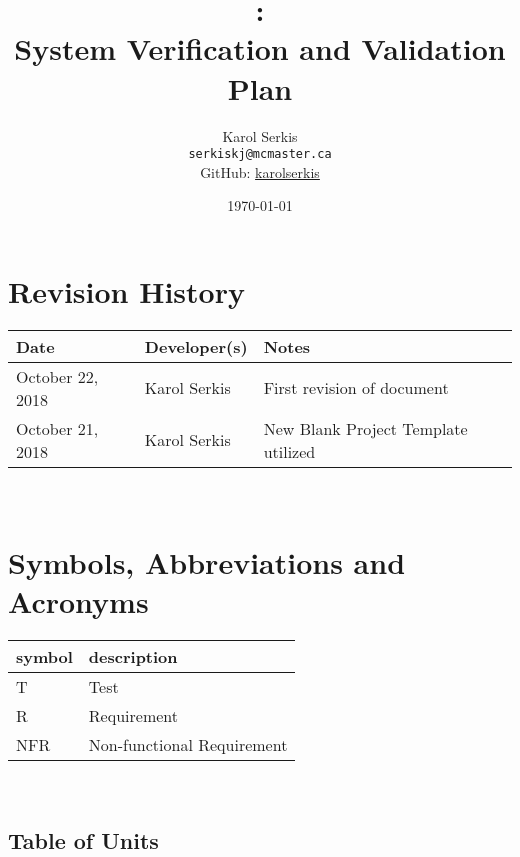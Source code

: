 \documentclass[12pt, titlepage]{article}
\begin{document}
\title{\progname:\\ System Verification and Validation Plan} 
\author{Karol Serkis\\\texttt{serkiskj@mcmaster.ca}\\GitHub:
\href{https://www.github.com/karolserkis}{karolserkis} }
\date{\today}
	
\maketitle


\section{Revision History}

\begin{tabularx}{\textwidth}{p{3.3cm}p{2.5cm}X}
\toprule {\bf Date} & {\bf Developer(s)} & {\bf Notes}\\
\midrule
October 22, 2018 & Karol Serkis & First revision of document\\
October 21, 2018 & Karol Serkis & New Blank Project Template utilized \\
\bottomrule
\end{tabularx}

~\newpage

\section{Symbols, Abbreviations and Acronyms}

\renewcommand{\arraystretch}{1.2}
\begin{tabular}{l l} 
  \toprule		
  \textbf{symbol} & \textbf{description}\\
  \midrule 
  T & Test\\
  R & Requirement\\ 
  NFR & Non-functional Requirement\\ 
  \bottomrule
\end{tabular}\\

 

\subsection{Table of Units}
\end{document}
